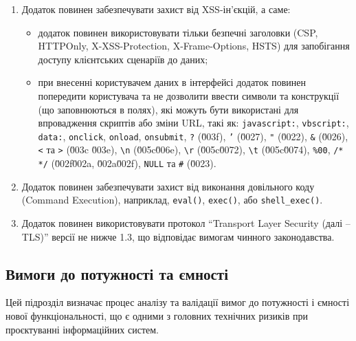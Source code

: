 \documentclass{article}
\begin{document}
\begin{enumerate}
  \item Додаток повинен забезпечувати захист від XSS-ін'єкцій, а саме:
    \begin{itemize}
      \item додаток повинен використовувати тільки безпечні заголовки (CSP, HTTPOnly, X-XSS-Protection, X-Frame-Options, HSTS) для запобігання доступу клієнтських сценаріїв до даних;
      \item при внесенні користувачем даних в інтерфейсі додаток повинен попередити користувача та не дозволити
           ввести символи та конструкції (що заповнюються в полях), які можуть бути використані для впровадження
           скриптів або зміни URL, такі як: \texttt{javascript:}, \texttt{vbscript:}, \texttt{data:}, \texttt{onclick},
           \texttt{onload}, \texttt{onsubmit}, \texttt{?} (\u003f), \texttt{'} (\u0027), \texttt{"}
           (\u0022), \texttt{\&} (\u0026), \texttt{<} та \texttt{>} (\u003c \u003e), \texttt{\textbackslash n}
           (\u005c\u006e), \texttt{\textbackslash r} (\u005c\u0072), \texttt{\textbackslash t} (\u005c\u0074),
           \texttt{\%00}, \texttt{/* */} (\u002f\u002a, \u002a\u002f), \texttt{NULL} та \texttt{\#} (\u0023).
    \end{itemize}

  \item Додаток повинен забезпечувати захист від виконання довільного коду (Command Execution), наприклад, \texttt{eval()}, \texttt{exec()}, або \texttt{shell\_exec()}.

  \item Додаток повинен використовувати протокол ``Transport Layer Security (далі – TLS)'' версії не нижче 1.3, що відповідає вимогам чинного законодавства.
\end{enumerate}


\newpage
\subsection{Вимоги до потужності та ємності}

Цей підрозділ визначає процес аналізу та валідації вимог до потужності і ємності нової функціональності,
що є одними з головних технічних ризиків при проєктуванні інформаційних систем.
\end{document}
